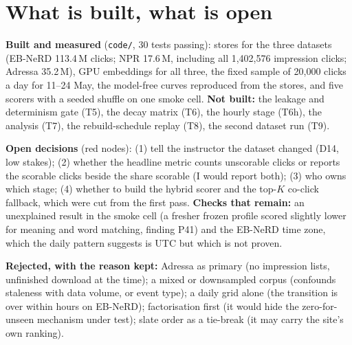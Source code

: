 \documentclass[9pt,a4paper]{article}
\begin{document}
\section{What is built, what is open}

\textbf{Built and measured} (\texttt{code/}, 30 tests passing): stores for the three datasets (EB-NeRD 113.4\,M clicks;
NPR 17.6\,M, including all 1,402,576 impression clicks; Adressa 35.2\,M), GPU embeddings for all three, the fixed
sample of 20,000 clicks a day for 11--24 May, the model-free curves reproduced from the stores, and five scorers
with a seeded shuffle on one smoke cell. \textbf{Not built:} the leakage and determinism gate (T5), the decay matrix
(T6), the hourly stage (T6h), the analysis (T7), the rebuild-schedule replay (T8), the second dataset run (T9).

\textbf{Open decisions} (red nodes): (1) tell the instructor the dataset changed (D14, low stakes); (2) whether the
headline metric counts unscorable clicks or reports the scorable clicks beside the share scorable (I would report both);
(3) who owns which stage; (4) whether to build the hybrid scorer and the top-$K$ co-click fallback, which were cut from
the first pass. \textbf{Checks that remain:} an unexplained result in the smoke cell (a fresher frozen profile scored
slightly lower for meaning and word matching, finding P41) and the EB-NeRD time zone, which the daily pattern suggests is UTC
but which is not proven.

\vspace{3pt}
\textbf{Rejected, with the reason kept:} Adressa as primary (no impression lists, unfinished download at the time); a
mixed or downsampled corpus (confounds staleness with data volume, or event type); a daily grid alone (the transition
is over within hours on EB-NeRD); factorisation first (it would hide the zero-for-unseen mechanism under test); slate
order as a tie-break (it may carry the site's own ranking).
\end{document}

